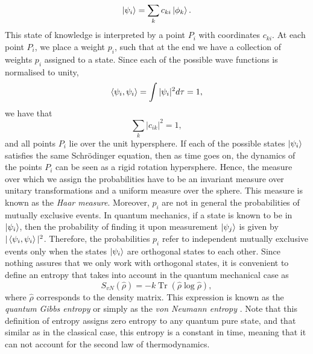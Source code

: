 \begin{equation}
\mathinner{|{\psi_{i}}\rangle} = \sum_{k}c_{ki}\mathinner{|{\phi_k}\rangle}.
\end{equation}
This state of knowledge is interpreted by a point $P_i$ with coordinates $c_{ki}$. At each point $P_i$, we place a weight $p_i$, such that at the end we have a collection of weights $p_i$ assigned to a state. Since each of the possible wave functions is normalised to unity,
\begin{equation}
\mathinner{\langle{\psi_{i},\psi_{i}}\rangle} = \int |\psi_i|^2 d\tau =1, 
\end{equation}
we have that 
\begin{equation}
\sum_k |c_{ik}|^2= 1,
\end{equation}
and all points $P_i$ lie over the unit hypersphere. If each of the possible states $\mathinner{|{\psi_i}\rangle}$ satisfies the same Schr\"odinger equation, then as time goes on, the dynamics of the points $P_i$ can be seen as a rigid rotation hypersphere. Hence, the measure over which we assign the probabilities have to be an invariant measure over unitary transformations and a uniform measure over the sphere. This measure is known as the \textit{Haar measure}. Moreover, $p_i$ are not in general the probabilities of mutually exclusive events. In quantum mechanics, if a state is known to be in $\mathinner{|{\psi_i}\rangle}$, then the probability of finding it upon measurement $\mathinner{|{\psi_j}\rangle}$ is given by $|\mathinner{\langle{\psi_{i},\psi_{i}}\rangle}|^2$. Therefore, the probabilities $p_i$ refer to independent mutually exclusive events only when the states $\mathinner{|{\psi_i}\rangle}$ are orthogonal states to each other. Since nothing assures that we only work with orthogonal states, it is convenient to define an entropy that takes into account in the quantum mechanical case as 
\begin{equation}
S_{vN}(\hat{\rho}) = -k\operatorname{Tr}(\hat{\rho}\log \hat{\rho}),
\end{equation}
where $\hat{\rho}$ corresponds to the density matrix. This expression is known as the \textit{quantum Gibbs entropy} or simply  as the \textit{von Neumann entropy} \cite{von_neumann_mathematical_1955}. Note that this definition of entropy assigns zero entropy to any quantum pure state, and that similar as in the classical case, this entropy is a constant in time, meaning that it can not account for the second law of thermodynamics.\\	
